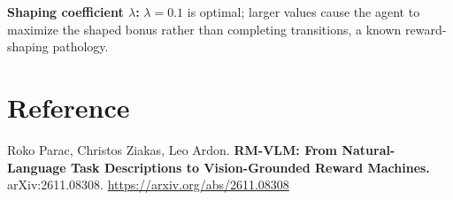 \documentclass[10pt,twocolumn]{article}
\begin{document}
\textbf{Shaping coefficient $\lambda$:} $\lambda = 0.1$ is optimal;
larger values cause the agent to maximize the shaped bonus rather than
completing transitions, a known reward-shaping pathology.

\section*{Reference}

Roko Parac, Christos Ziakas, Leo Ardon.
\textbf{RM-VLM: From Natural-Language Task Descriptions to
Vision-Grounded Reward Machines.}
arXiv:2611.08308.
\url{https://arxiv.org/abs/2611.08308}
\end{document}
